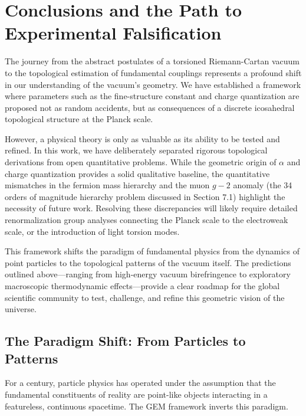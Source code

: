 \section{Conclusions and the Path to Experimental Falsification}
\label{sec:conclusions}

The journey from the abstract postulates of a torsioned Riemann-Cartan vacuum to the topological estimation of fundamental couplings represents a profound shift in our understanding of the vacuum's geometry. We have established a framework where parameters such as the fine-structure constant and charge quantization are proposed not as random accidents, but as consequences of a discrete icosahedral topological structure at the Planck scale.

However, a physical theory is only as valuable as its ability to be tested and refined. In this work, we have deliberately separated rigorous topological derivations from open quantitative problems. While the geometric origin of $\alpha$ and charge quantization provides a solid qualitative baseline, the quantitative mismatches in the fermion mass hierarchy and the muon $g-2$ anomaly (the 34 orders of magnitude hierarchy problem discussed in Section 7.1) highlight the necessity of future work. Resolving these discrepancies will likely require detailed renormalization group analyses connecting the Planck scale to the electroweak scale, or the introduction of light torsion modes.

This framework shifts the paradigm of fundamental physics from the dynamics of point particles to the topological patterns of the vacuum itself. The predictions outlined above—ranging from high-energy vacuum birefringence to exploratory macroscopic thermodynamic effects—provide a clear roadmap for the global scientific community to test, challenge, and refine this geometric vision of the universe.

\subsection{The Paradigm Shift: From Particles to Patterns}

For a century, particle physics has operated under the assumption that the fundamental constituents of reality are point-like objects interacting in a featureless, continuous spacetime. The GEM framework inverts this paradigm. 

